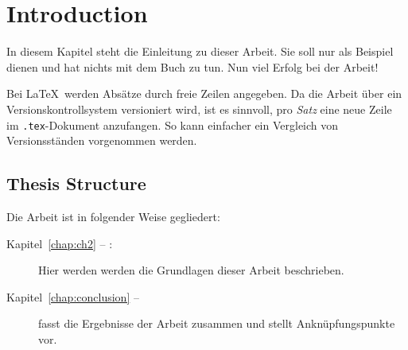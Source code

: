 
\chapter{Introduction}
In diesem Kapitel steht die Einleitung zu dieser Arbeit.
Sie soll nur als Beispiel dienen und hat nichts mit dem Buch \cite{WSPA} zu tun.
Nun viel Erfolg bei der Arbeit!

Bei \LaTeX\ werden Absätze durch freie Zeilen angegeben.
Da die Arbeit über ein Versionskontrollsystem versioniert wird, ist es sinnvoll, pro \emph{Satz} eine neue Zeile im \texttt{.tex}-Dokument anzufangen.
So kann einfacher ein Vergleich von Versionsständen vorgenommen werden.

\section*{Thesis Structure}
Die Arbeit ist in folgender Weise gegliedert:
\begin{description}
\item[Kapitel~\ref{chap:ch2} -- :] Hier werden werden die Grundlagen dieser Arbeit beschrieben.
\item[Kapitel~\ref{chap:conclusion} -- ] fasst die Ergebnisse der Arbeit zusammen und stellt Anknüpfungspunkte vor.
\end{description}
